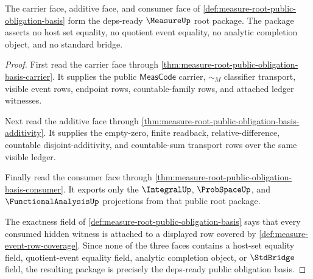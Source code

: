 \begin{theorem}
\label{thm:measure-root-public-obligation-basis-exactness}
The carrier face, additive face, and consumer face of
\autoref{def:measure-root-public-obligation-basis} form the deps-ready
$\MeasureUp$ root package. The package asserts no host set equality, no
quotient event equality, no analytic completion object, and no standard
bridge.
\end{theorem}
\begin{proof}
First read the carrier face through
\autoref{thm:measure-root-public-obligation-basis-carrier}. It supplies the
public $\mathsf{MeasCode}$ carrier, $\sim_M$ classifier transport, visible
event rows, endpoint rows, countable-family rows, and attached ledger
witnesses.

Next read the additive face through
\autoref{thm:measure-root-public-obligation-basis-additivity}. It supplies
the empty-zero, finite readback, relative-difference, countable
disjoint-additivity, and countable-sum transport rows over the same visible
ledger.

Finally read the consumer face through
\autoref{thm:measure-root-public-obligation-basis-consumer}. It exports only
the $\IntegralUp$, $\ProbSpaceUp$, and $\FunctionalAnalysisUp$ projections
from that public root package.

The exactness field of
\autoref{def:measure-root-public-obligation-basis} says that every consumed
hidden witness is attached to a displayed row covered by
\autoref{def:measure-event-row-coverage}. Since none of the three faces
contains a host-set equality field, quotient-event equality field, analytic
completion object, or $\StdBridge$ field, the resulting package is precisely
the deps-ready public obligation basis.
\end{proof}
